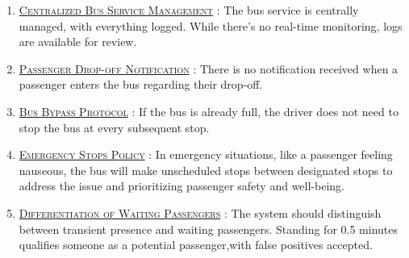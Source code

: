 \begin{enumerate}
    \item \underline{\textsc{Centralized Bus Service Management}} : The bus service is centrally managed, with everything logged. While there's no real-time monitoring, logs are available for review.

    \item \underline{\textsc{Passenger Drop-off Notification}} : There is no notification received when a passenger enters the bus regarding their drop-off.

    \item \underline{\textsc{Bus Bypass Protocol}} : If the bus is already full, the driver does not need to stop the bus at every subsequent stop.

    \item \underline{\textsc{Emergency Stops Policy}} : In emergency situations, like a passenger feeling nauseous, the bus will make unscheduled stops between designated stops to address the issue and prioritizing passenger safety and well-being.

    \item \underline{\textsc{Differentiation of Waiting Passengers}} : The system should distinguish between transient presence and waiting passengers. Standing for 0.5 minutes qualifies someone as a potential passenger,with false positives accepted.
\end{enumerate}
